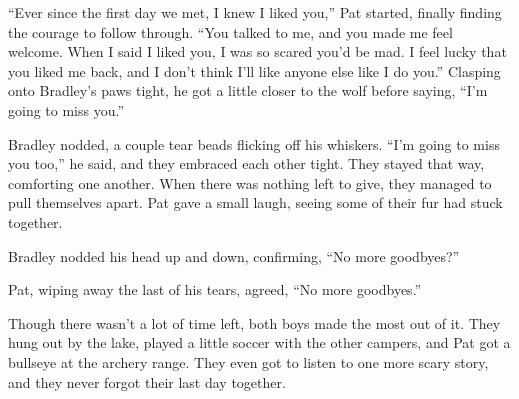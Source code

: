 ``Ever since the first day we met, I knew I liked you,'' Pat started,
finally finding the courage to follow through. ``You talked to me, and
you made me feel welcome. When I said I liked you, I was so scared you'd
be mad. I feel lucky that you liked me back, and I don't think I'll like
anyone else like I do you.'' Clasping onto Bradley's paws tight, he got
a little closer to the wolf before saying, ``I'm going to miss you.''

Bradley nodded, a couple tear beads flicking off his whiskers. ``I'm
going to miss you too,'' he said, and they embraced each other tight.
They stayed that way, comforting one another. When there was nothing
left to give, they managed to pull themselves apart. Pat gave a small
laugh, seeing some of their fur had stuck together.

Bradley nodded his head up and down, confirming, ``No more goodbyes?''

Pat, wiping away the last of his tears, agreed, ``No more goodbyes.''

Though there wasn't a lot of time left, both boys made the most out of
it. They hung out by the lake, played a little soccer with the other
campers, and Pat got a bullseye at the archery range. They even got to
listen to one more scary story, and they never forgot their last day
together.
